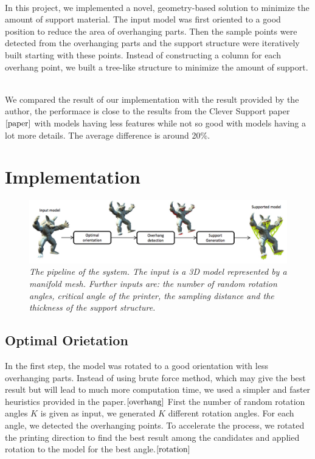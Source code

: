 \documentclass[11pt, a4paper]{article}
\begin{document}
	~\\In this project, we implemented a novel, geometry-based solution to minimize the amount of support material. The input model was first oriented to a good position to reduce the area of overhanging parts. Then the sample points were detected from the overhanging parts and the support structure were iteratively built starting with these points. Instead of constructing a column for each overhang point, we built a tree-like structure to minimize the amount of support.

	~\\We compared the result of our implementation with the result provided by the author, the performace is close to the results from the Clever Support paper $\cite{paper}$ with models having less features while not so good with models having a lot more details. The average difference is around 20\%.
	\newpage
	\section{Implementation}
	\begin{figure}[!ht]
  		\centering
      	\includegraphics[width=1.0\textwidth]{Figure_1.png}
  	\caption{\textit{The pipeline of the system. The input is a 3D model represented by a manifold mesh. Further inputs are: the number of random rotation angles, critical angle of the printer, the sampling distance and the thickness of the support structure.}}
	\end{figure}
	

	\subsection{Optimal Orietation}
	In the first step, the model was rotated to a good orientation with less overhanging parts. Instead of using brute force method, which may give the best result but will lead to much more computation time, we used a simpler and faster heuristics provided in the paper.$\cite{overhang}$ First the number of random rotation angles $K$ is given as input, we generated $K$ different rotation angles. For each angle, we detected the overhanging points. To accelerate the process, we rotated the printing direction to find the best result among the candidates and applied rotation to the model for the best angle.$\cite{rotation}$ 
\end{document}
